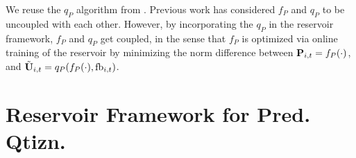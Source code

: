 \documentclass[conference]{IEEEtran}
\begin{document}
{%
We reuse the $q_P$ algorithm from \cite{6891198}.
Previous work \cite{6891198} has considered $f_P$ and $q_P$ to be uncoupled with each other.
However, by incorporating the $q_P$ in the reservoir framework, $f_P$ and $q_P$ get coupled, in the sense that $f_P$ is optimized via online training of the reservoir by minimizing the norm difference between ${\bf P}_{i,t}=f_P(\cdot)$, and $\tilde{{\bf U}}_{i,t}=q_P(f_P(\cdot),\text{fb}_{i,t})$.

\section{Reservoir Framework for Pred. Qtizn.}
\label{section3}
}
\end{document}
